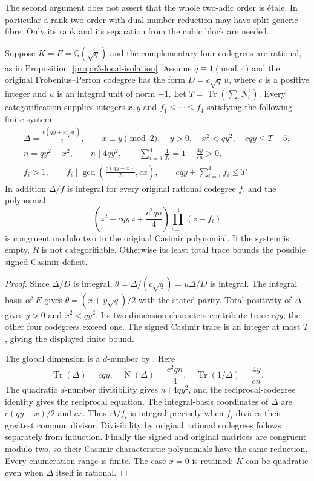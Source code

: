 The second argument does not assert that the whole two-adic order
is \'etale. In particular a rank-two order with dual-number
reduction may have split generic fibre. Only its rank and its
separation from the cubic block are needed.

\begin{proposition}
\label{prop:r3-quadratic-spectrum}
Suppose $K=E=\mathbb Q(\sqrt q)$ and the complementary four
codegrees are rational, as in Proposition~\ref{prop:r3-local-isolation}.
Assume $q\equiv1\pmod4$ and the original Frobenius--Perron
codegree has the form $D=c\sqrt q\,u$, where $c$ is a positive
integer and $u$ is an integral unit of norm $-1$.
Let $T=\operatorname{Tr}(\sum_iN_i^2)$.
Every categorification supplies integers $x,y$ and
$f_1\leq\cdots\leq f_4$ satisfying the following finite system:
\[
\begin{gathered}
 \Delta=\frac{c(qy+x\sqrt q)}2,\qquad
 x\equiv y\pmod2,\quad y>0,\quad x^2<qy^2,\quad cqy\leq T-5,\\
 n=qy^2-x^2,\qquad n\mid4qy^2,\qquad
 \sum_{i=1}^4\frac1{f_i}=1-\frac{4y}{cn}>0,\\
 f_i>1,\qquad
 f_i\mid\gcd\left(\frac{c(qy-x)}2,cx\right),\qquad
 cqy+\sum_{i=1}^4f_i\leq T.
\end{gathered}
\]
In addition $\Delta/f$ is integral for every original rational
codegree $f$, and the polynomial
\[
 \left(z^2-cqy\,z+\frac{c^2qn}{4}\right)
       \prod_{i=1}^4(z-f_i)
\]
is congruent modulo two to the original Casimir polynomial.
If the system is empty, $R$ is not categorifiable. Otherwise its
least total trace bounds the possible signed Casimir deficit.
\end{proposition}
\begin{proof}
Since $\Delta/D$ is integral,
$\theta=\Delta/(c\sqrt q)=u\Delta/D$ is integral. The integral
basis of $E$ gives $\theta=(x+y\sqrt q)/2$ with the stated
parity. Total positivity of $\Delta$ gives $y>0$ and
$x^2<qy^2$. Its two dimension characters contribute trace $cqy$;
the other four codegrees exceed one. The signed Casimir trace is
an integer at most $T$, giving the displayed finite bound.

The global dimension is a $d$-number by
\cite[Theorem~1.2]{Ocode}. Here
\[
 \operatorname{Tr}(\Delta)=cqy,\quad
 \operatorname{N}(\Delta)=\frac{c^2qn}{4},\quad
 \operatorname{Tr}(1/\Delta)=\frac{4y}{cn}.
\]
The quadratic $d$-number divisibility gives $n\mid4qy^2$,
and the reciprocal-codegree identity gives the reciprocal equation.
The integral-basis coordinates of $\Delta$ are
$c(qy-x)/2$ and $cx$. Thus $\Delta/f_i$ is integral precisely
when $f_i$ divides their greatest common divisor. Divisibility
by original rational codegrees follows separately from induction.
Finally the signed and original matrices are congruent modulo two,
so their Casimir characteristic polynomials have the same reduction.
Every enumeration range is finite. The case $x=0$ is retained:
$K$ can be quadratic even when $\Delta$ itself is rational.
\end{proof}

